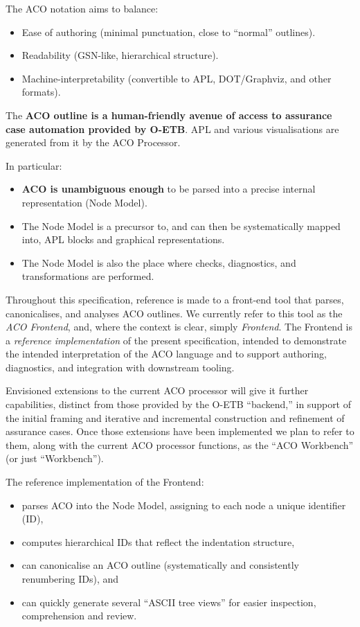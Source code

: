 \documentclass[11pt,twoside,a4paper]{article}
\begin{document}
The ACO notation aims to balance:
\begin{itemize}[leftmargin=2em]
  \item Ease of authoring (minimal punctuation, close to ``normal'' outlines).
  \item Readability (GSN-like, hierarchical structure).
  \item Machine-interpretability (convertible to APL, DOT/Graphviz, and other formats).
\end{itemize}

The \textbf{ACO outline is a human-friendly avenue of access to assurance case automation provided by O-ETB}.
APL and various visualisations are generated from it by the ACO Processor.

In particular:
\begin{itemize}[leftmargin=2em]
  \item \textbf{ACO is unambiguous enough} to be parsed into a precise internal representation (Node Model).
  \item The Node Model is a precursor to, and can then be systematically mapped into, APL blocks and graphical representations.
  \item The Node Model is also the place where checks, diagnostics, and transformations are performed.
\end{itemize}

Throughout this specification, reference is made to a front-end tool that parses,
canonicalises, and analyses ACO outlines.
We currently refer to this tool as the
\emph{ACO Frontend}, and, where the
context is clear, simply \emph{Frontend}.
The Frontend is a \emph{reference implementation} of the present
specification, intended to demonstrate the intended interpretation of the ACO
language and to support authoring, diagnostics, and integration with downstream
tooling.

Envisioned extensions to the current ACO processor will give it further capabilities, distinct from those provided by the O-ETB ``backend,'' in support of the initial framing and iterative and incremental construction and refinement of assurance cases.
Once those extensions have been implemented we plan to refer to them, along with the current ACO processor functions, as the ``ACO Workbench'' (or just ``Workbench'').

The reference implementation of the Frontend:
\begin{itemize}[leftmargin=2em]
  \item parses ACO into the Node Model, assigning to each node a unique identifier (ID),
  \item computes hierarchical IDs that reflect the indentation structure,
  \item can canonicalise an ACO outline (systematically and consistently renumbering IDs), and
  \item can quickly generate several ``ASCII tree views'' for easier inspection, comprehension and review.
\end{itemize}
\end{document}
